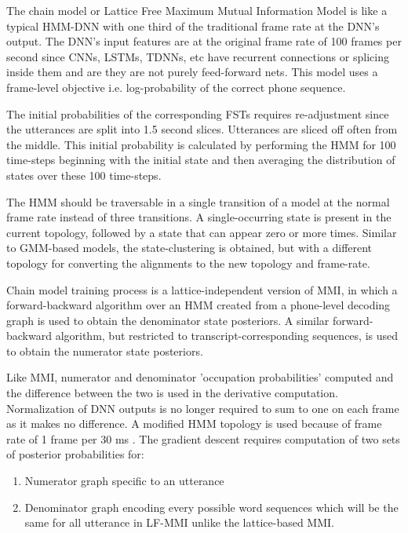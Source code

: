 The chain model or Lattice Free Maximum Mutual Information Model is like a typical HMM-DNN with one third of the traditional frame rate at the DNN's output. The DNN's input features are at the original frame rate of 100 frames per second since CNNs, LSTMs, TDNNs, etc have recurrent connections or splicing inside them and are they are not purely feed-forward nets. This model uses a frame-level objective i.e. log-probability of the correct phone sequence. 

The initial probabilities of the corresponding FSTs requires re-adjustment since the utterances are split into 1.5 second slices. Utterances are sliced off often from the middle. This initial probability is calculated by performing the HMM for 100 time-steps beginning with the initial state and then averaging the distribution of states over these 100 time-steps.

The HMM should be traversable in a single transition of a model at the normal frame rate instead of three transitions. A single-occurring state is present in the current topology, followed by a state that can appear zero or more times. Similar to GMM-based models, the state-clustering is obtained, but with a different topology for converting the alignments to the new topology and frame-rate.

Chain model training process is a lattice-independent version of MMI, in which a forward-backward algorithm over an HMM created from a phone-level decoding graph is used to obtain the denominator state posteriors. A similar forward-backward algorithm, but restricted to transcript-corresponding sequences, is used to obtain the numerator state posteriors.

Like MMI, numerator and denominator 'occupation probabilities' computed and the difference between the two is used in the derivative computation. Normalization of DNN outputs is no longer required to sum to one on each frame as it makes no difference. A modified HMM topology is used because of frame rate of 1 frame per 30 ms \cite{daniel_povey_kaldi_nodate}. The gradient descent requires computation of two sets of posterior probabilities for: 
    \begin{enumerate}
    \item Numerator graph specific to an utterance 
    \item Denominator graph encoding every possible word sequences which will be the same for all utterance in LF-MMI unlike the lattice-based MMI. 
\end{enumerate}

